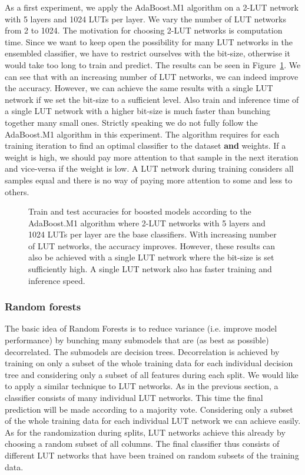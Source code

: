 \noindent As a first experiment, we apply the AdaBoost.M1 algorithm on a 2-LUT network with 5 layers and 1024 LUTs per layer. We vary the number of LUT networks from 2 to 1024. The motivation for choosing 2-LUT networks is computation time. Since we want to keep open the possibility for many LUT networks in the ensembled classifier, we have to restrict ourselves with the bit-size, otherwise it would take too long to train and predict. The results can be seen in Figure~\ref{fig:ada_2_LUT}. We can see that with an increasing number of LUT networks, we can indeed improve the accuracy. However, we can achieve the same results with a single LUT network if we set the bit-size to a sufficient level. Also train and inference time of a single LUT network with a higher bit-size is much faster than bunching together many small ones. Strictly speaking we do not fully follow the AdaBoost.M1 algorithm in this experiment. The algorithm requires for each training iteration to find an optimal classifier to the dataset \textbf{and} weights. If a weight is high, we should pay more attention to that sample in the next iteration and vice-versa if the weight is low. A LUT network during training considers all samples equal and there is no way of paying more attention to some and less to others.

\begin{figure}[!htb]
    \centering
    
    \caption{Train and test accuracies for boosted models according to the AdaBoost.M1 algorithm where 2-LUT networks with 5 layers and 1024 LUTs per layer are the base classifiers. With increasing number of LUT networks, the accuracy improves. However, these results can also be achieved with a single LUT network where the bit-size is set sufficiently high. A single LUT network also has faster training and inference speed.}
\label{fig:ada_2_LUT}
\end{figure}
\FloatBarrier

\subsubsection{Random forests}
The basic idea of Random Forests is to reduce variance (i.e. improve model performance) by bunching many submodels that are (as best as possible) decorrelated. The submodels are decision trees. Decorrelation is achieved by training on only a subset of the whole training data for each individual decision tree and considering only a subset of all features during each split. We would like to apply a similar technique to LUT networks. As in the previous section, a classifier consists of many individual LUT networks. This time the final prediction will be made according to a majority vote. Considering only a subset of the whole training data for each individual LUT network we can achieve easily. As for the randomization during splits, LUT networks achieve this already by choosing a random subset of all columns. The final classifier thus consists of different LUT networks that have been trained on random subsets of the training data.

